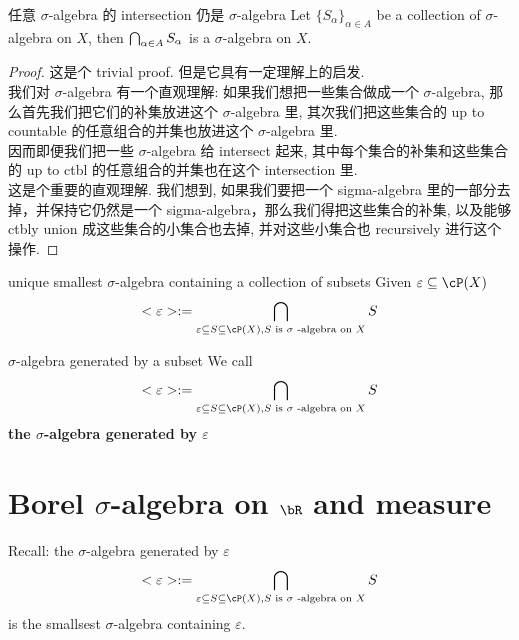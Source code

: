 \documentclass[lang=cn,11pt]{elegantbook}
\begin{document}
\begin{lemma}{任意 $\sigma$-algebra 的 intersection 仍是 $\sigma$-algebra}
Let $\{S_\alpha \}_{\alpha \in A}$ be a collection of $\sigma$-algebra on $X$, then $\bigcap_{\alpha \in A} S_\alpha$ is a $\sigma$-algebra on $X$. 
\end{lemma}
\begin{proof}
    这是个 trivial proof. 但是它具有一定理解上的启发.\\
    我们对 $\sigma$-algebra 有一个直观理解: 如果我们想把一些集合做成一个 $\sigma$-algebra, 那么首先我们把它们的补集放进这个 $\sigma$-algebra 里, 其次我们把这些集合的 up to countable 的任意组合的并集也放进这个 $\sigma$-algebra 里.\\
    因而即便我们把一些 $\sigma$-algebra 给 intersect 起来, 其中每个集合的补集和这些集合的 up to ctbl 的任意组合的并集也在这个 intersection 里.\\
    这是个重要的直观理解. 我们想到, 如果我们要把一个 sigma-algebra 里的一部分去掉，并保持它仍然是一个 sigma-algebra，那么我们得把这些集合的补集, 以及能够 ctbly union 成这些集合的小集合也去掉, 并对这些小集合也 recursively 进行这个操作.
\end{proof}

\begin{corollary}{unique smallest $\sigma$-algebra containing a collection of subsets}
    Given $\varepsilon  \sub \cP(X)$
    $$
    <\varepsilon> := \intsec_{\varepsilon  \sub S \sub \cP(X), \newline S \text{ is }\sigma \text{ -algebra on } X} S
    $$
\end{corollary}

\begin{definition}{$\sigma$-algebra generated by a subset}
We call  $$
    <\varepsilon> := \intsec_{\varepsilon  \sub S \sub \cP(X), \newline S \text{ is }\sigma \text{ -algebra on } X} S
    $$ \textbf{the $\sigma$-algebra generated by $\varepsilon$ }
\end{definition}



\chapter{Borel $\sigma$-algebra on $\bR$ and measure}
\noindent Recall: the $\sigma$-algebra generated by $\varepsilon$
    $$
    <\varepsilon> := \intsec_{\varepsilon  \sub S \sub \cP(X), \newline S \text{ is }\sigma \text{ -algebra on } X} S
    $$ is the smallsest $\sigma$-algebra containing $\varepsilon$.
\end{document}
